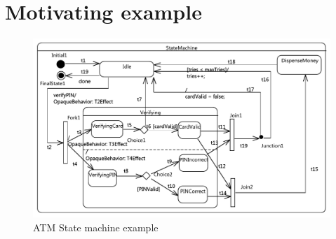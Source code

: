 \section{Motivating example}
\label{sec:example}
\begin{figure}
	\centering
	\includegraphics[clip, trim=0.2cm 0.2cm 0.2cm 0.2cm, width=1.0\columnwidth]{figures/ATM.pdf}
	\caption{ATM State machine example} 
	\label{fig:example}
\end{figure}
